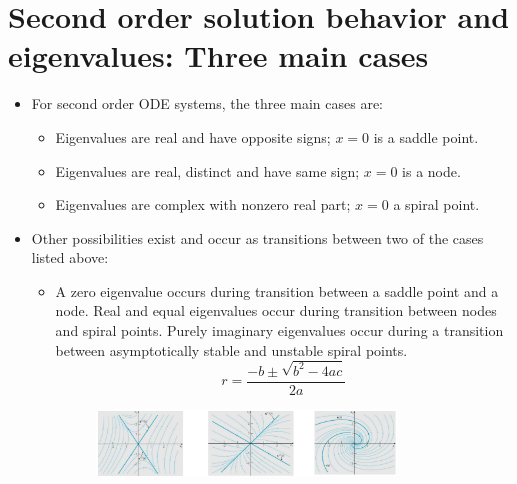 \documentclass[11pt,a4paper]{article}
\begin{document}
	\section*{Second order solution behavior and eigenvalues: Three main cases}
	\begin{itemize}
		\item For second order ODE systems, the three main cases are:
		\begin{itemize}
			\item[\labelitemi] Eigenvalues are real and have opposite signs; $x = 0$ is a saddle point.
			\item[\labelitemi] Eigenvalues are real, distinct and have same sign; $x = 0$ is a node.
			\item[\labelitemi] Eigenvalues are complex with nonzero real part; $x = 0$ a spiral point. 
		\end{itemize}
		\item Other possibilities exist and occur as transitions between two of the cases listed above:
		\begin{itemize}
			\item[\labelitemi] A zero eigenvalue occurs during transition between a saddle point and a node. Real and equal eigenvalues occur during transition between nodes and spiral points. Purely imaginary eigenvalues occur during a transition between asymptotically stable and unstable spiral points. 
			$$
			r = \frac{-b \pm \sqrt{b^2-4ac}}{2a}
			$$
			\begin{figure}[H]
				\centering
					\includegraphics[width=0.80\textwidth]{figure/Lec13f4.PNG}
			\end{figure}
		\end{itemize}
	\end{itemize}
\end{document}

